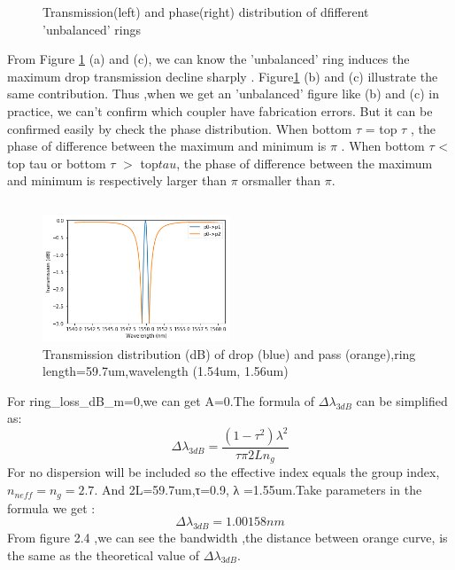 \documentclass[fontsize=11pt]{scrartcl}
\begin{document}
\begin{figure}[ht]
    \caption{Transmission(left) and phase(right) distribution of dfifferent 'unbalanced' rings}
    \label{T2b}
    \end{figure}
    From Figure \ref{T2b} (a) and (c), we can know the 'unbalanced' ring induces the maximum drop transmission decline sharply .
    Figure\ref{T2b} (b) and (c) illustrate the same contribution.
    Thus ,when we get an 'unbalanced' figure like (b) and (c) in practice, 
    we can't confirm which coupler have fabrication errors. 
    But it can be confirmed easily by check the phase distribution.
    When bottom $\tau$ = top $\tau$ , the phase of difference between the maximum and minimum is $\pi$ .
    When bottom $\tau$ < top tau or bottom $\tau$ $>$ top$ tau $, 
    the phase of difference between the maximum and minimum is respectively larger than $\pi$ orsmaller than $\pi$.
 \subsection{}
 \begin{figure}[h]
    \centering
    \includegraphics[width=0.5\textwidth]{img/T2_3.png}
    \caption{Transmission distribution (dB) of drop (blue) and pass (orange),ring \\
    length=59.7um,wavelength (1.54um, 1.56um)}
    \label{t2_2}
\end{figure}
For ring_loss_dB_m=0,we can get A=0.The formula of $\Delta \lambda _{3dB}$ can be simplified as:
\begin{equation}
    \Delta \lambda _{3dB}=\frac{(1-\tau^2)\lambda^2}{\tau \pi 2Ln_g}
\end{equation}
For no dispersion will be included so the effective index equals the group index,$n_{neff}=n_g=2.7$.
And  2L=59.7um,τ=0.9, λ =1.55um.Take parameters in the formula we get :
$$\Delta \lambda _{3dB}=1.00158 nm $$
From figure 2.4 ,we can see the bandwidth ,the distance between orange curve, 
is the same as the theoretical value of $\Delta \lambda _{3dB}$. 
\pagebreak
\end{document}

